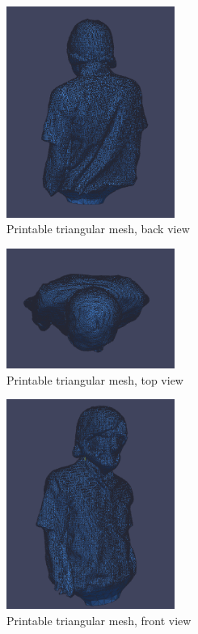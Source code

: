 \begin{figure}[ht!]
  \centering
    \includegraphics[width=0.49\textwidth]{figures/sundinPCLback.png}
    \caption{Printable triangular mesh, back view}
    \label{fig:sundin-back-pcl}
\end{figure}

\begin{figure}[ht!]
  \centering
    \includegraphics[width=0.49\textwidth]{figures/sundinPCLtop.png}
    \caption{Printable triangular mesh, top view}
    \label{fig:sundin-top-pcl}
\end{figure}

\begin{figure}[ht!]
  \centering
    \includegraphics[width=0.49\textwidth]{figures/sundinPCLFront.png}
    \caption{Printable triangular mesh, front view}
    \label{fig:sundin-front-pcl}
\end{figure}



